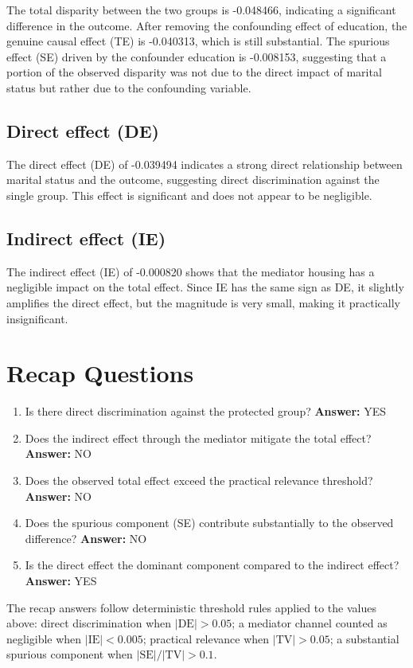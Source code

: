 \documentclass[11pt]{article}
\begin{document}
The total disparity between the two groups is -0.048466, indicating a significant difference in the outcome. After removing the confounding effect of education, the genuine causal effect (TE) is -0.040313, which is still substantial. The spurious effect (SE) driven by the confounder education is -0.008153, suggesting that a portion of the observed disparity was not due to the direct impact of marital status but rather due to the confounding variable.

\subsection{Direct effect (DE)}

The direct effect (DE) of -0.039494 indicates a strong direct relationship between marital status and the outcome, suggesting direct discrimination against the single group. This effect is significant and does not appear to be negligible.

\subsection{Indirect effect (IE)}

The indirect effect (IE) of -0.000820 shows that the mediator housing has a negligible impact on the total effect. Since IE has the same sign as DE, it slightly amplifies the direct effect, but the magnitude is very small, making it practically insignificant.

\section{Recap Questions}

\begin{enumerate}
\item Is there direct discrimination against the protected group? \textbf{Answer:} YES
\item Does the indirect effect through the mediator mitigate the total effect? \textbf{Answer:} NO
\item Does the observed total effect exceed the practical relevance threshold? \textbf{Answer:} NO
\item Does the spurious component (SE) contribute substantially to the observed difference? \textbf{Answer:} NO
\item Is the direct effect the dominant component compared to the indirect effect? \textbf{Answer:} YES
\end{enumerate}

\vspace{1em}
\noindent\footnotesize
The recap answers follow deterministic threshold rules applied to the values above: direct discrimination when $|\mathrm{DE}| > 0.05$; a mediator channel counted as negligible when $|\mathrm{IE}| < 0.005$; practical relevance when $|\mathrm{TV}| > 0.05$; a substantial spurious component when $|\mathrm{SE}| / |\mathrm{TV}| > 0.1$.
\end{document}

